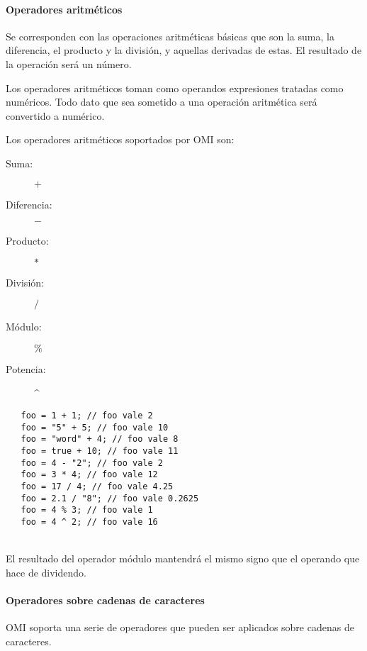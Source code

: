 \paragraph{Operadores aritméticos} \label{sec:op_arth}

Se corresponden con las operaciones aritméticas básicas que son la suma, la diferencia, el producto y la división, y 
aquellas derivadas de estas. El resultado de la operación será un número.

Los operadores aritméticos toman como operandos expresiones tratadas como numéricos. Todo dato que sea sometido a una operación
aritmética será convertido a numérico.

Los operadores aritméticos soportados por OMI son:

\begin{description}
\item [Suma:] $+$
\item [Diferencia:] $-$
\item [Producto:] $*$
\item [División:] $/$
\item [Módulo:] $\%$
\item [Potencia:] \^ \hfill   
\end{description} 


\begin{lstlisting}
   foo = 1 + 1; // foo vale 2
   foo = "5" + 5; // foo vale 10
   foo = "word" + 4; // foo vale 8
   foo = true + 10; // foo vale 11
   foo = 4 - "2"; // foo vale 2
   foo = 3 * 4; // foo vale 12
   foo = 17 / 4; // foo vale 4.25
   foo = 2.1 / "8"; // foo vale 0.2625
   foo = 4 % 3; // foo vale 1
   foo = 4 ^ 2; // foo vale 16 
\end{lstlisting} 
\hfill\\

El resultado del operador módulo mantendrá el mismo signo que el operando que hace de dividendo.




\paragraph{Operadores sobre cadenas de caracteres}\label{sec:op_string}
OMI soporta una serie de operadores que pueden ser aplicados sobre cadenas de caracteres. 


